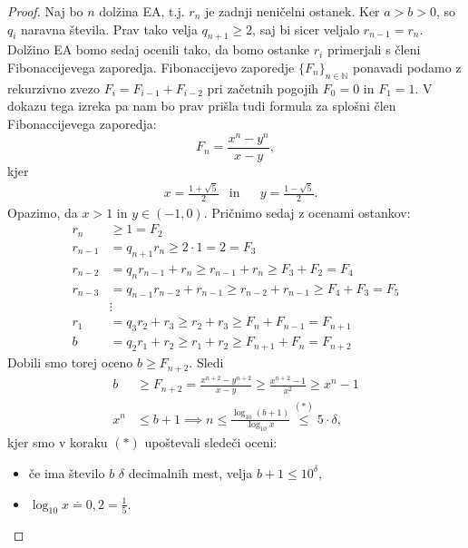\documentclass[12pt, a4paper]{article}
\begin{document}
\begin{proof}
Naj bo $n$ dolžina EA, t.j. $r_n$ je zadnji neničelni ostanek. Ker \mbox{$a>b>0$}, so $q_i$ naravna števila. Prav tako velja $q_{n+1}\geq 2$, saj bi sicer veljalo $r_{n-1}=r_n$. Dolžino EA bomo sedaj ocenili tako, da bomo ostanke $r_i$ primerjali s členi Fibonaccijevega zaporedja. Fibonaccijevo zaporedje $\{F_n\}_{n\in \mathbb{N}}$ ponavadi podamo z rekurzivno zvezo $F_i=F_{i-1}+F_{i-2}$ pri začetnih pogojih $F_0 = 0$ in $F_1=1$. V dokazu tega izreka pa nam bo prav prišla tudi formula za splošni člen Fibonaccijevega zaporedja:
$$F_n = \frac{x^n-y^n}{x-y},$$
kjer
\begin{align*}
&x=\frac{1 + \sqrt{5}}{2} &\text{in}&  &y=\frac{1 - \sqrt{5}}{2}.
\end{align*}
Opazimo, da $x>1$ in $y\in (-1,0)$. Pričnimo sedaj z ocenami ostankov:
\begin{align*}
r_n &\geq 1 = F_2 \\
r_{n-1} &= q_{n+1} r_n \geq 2\cdot 1 = 2 = F_3 \\
r_{n-2} &=q_n r_{n-1} + r_n \geq r_{n-1} + r_n \geq F_3 + F_2 = F_4 \\
r_{n-3} &= q_{n-1} r_{n-2} + r_{n-1} \geq r_{n-2} + r_{n-1} \geq F_4 + F_3 = F_5 \\
&\vdots \\
r_1 &= q_3 r_2 + r_3 \geq r_2 + r_3 \geq F_n + F_{n-1} = F_{n+1} \\
b &= q_2 r_1 + r_2 \geq r_1 + r_2 \geq F_{n+1} + F_n = F_{n+2}
\end{align*}
Dobili smo torej oceno $b\geq F_{n+2}$. Sledi
\begin{align*}
b &\geq F_{n+2} = \frac{x^{n+2}-y^{n+2}}{x-y} \geq \frac{x^{n+2} -1}{x^2} \geq x^n - 1 \\
x^n &\leq b+1 \implies n\leq \frac{\log_{10}{(b+1)}}{\log_{10}x} \overset{(*)}{\leq} 5 \cdot \delta,
\end{align*}
kjer smo v koraku $(*)$ upoštevali sledeči oceni:
\begin{itemize}
\item če ima število $b$ $\delta$ decimalnih mest, velja $b+1\leq 10^{\delta}$,
\item $\log_{10}x \overset{.}{=} 0,2 = \frac{1}{5}$.
\end{itemize}
\end{proof}
\end{document}

